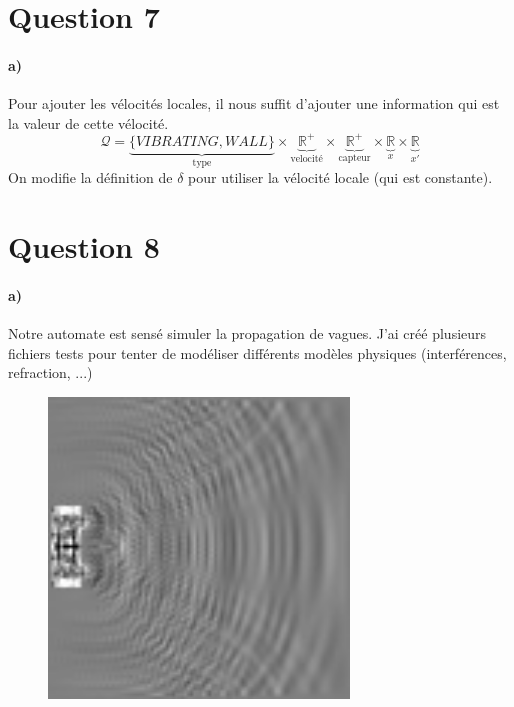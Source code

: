 \documentclass[a4paper]{article}
\begin{document}
  \section*{Question 7}
  
  \paragraph{a)} Pour ajouter les vélocités locales, il nous suffit d'ajouter une information qui est la valeur de cette vélocité.
  \[\mathcal Q = \underbrace{\{VIBRATING, WALL\}}_{\text{type}} \times \underbrace{\mathbb R^+}_{\text{velocité}} \times \underbrace{\mathbb R^+}_{\text{capteur}}\times \underbrace{\mathbb R}_{x} \times  \underbrace{\mathbb R}_{x'}\]
  On modifie la définition de $\delta$ pour utiliser la vélocité locale (qui est constante).
  
  \section*{Question 8}
  
  \paragraph{a)} Notre automate est sensé simuler la propagation de vagues. J'ai créé plusieurs fichiers tests pour tenter de modéliser différents modèles physiques (interférences, refraction, ...)
  
 \begin{figure}[h!]
   \centering
   \includegraphics[width=8cm]{refraction.jpg}
  \end{figure}
  
\end{document}
